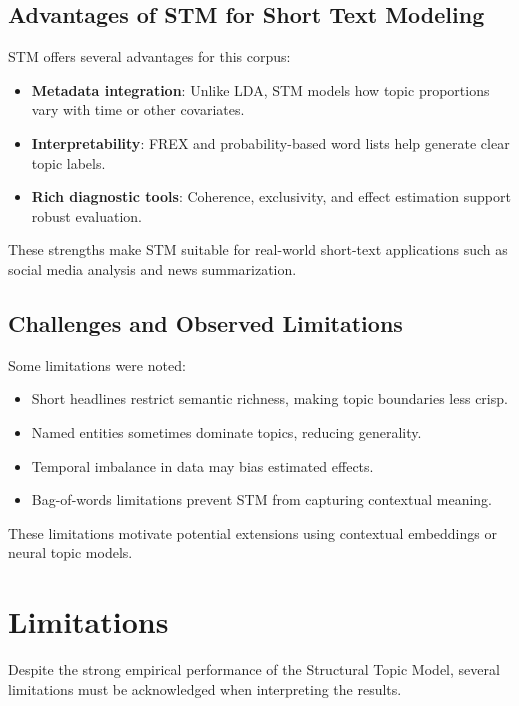 \documentclass[11pt]{article}
\begin{document}
\subsection{Advantages of STM for Short Text Modeling}

STM offers several advantages for this corpus:

\begin{itemize}
    \item \textbf{Metadata integration}: Unlike LDA, STM models how topic proportions vary with time or other covariates.
    \item \textbf{Interpretability}: FREX and probability-based word lists help generate clear topic labels.
    \item \textbf{Rich diagnostic tools}: Coherence, exclusivity, and effect estimation support robust evaluation.
\end{itemize}

These strengths make STM suitable for real-world short-text applications such as social media analysis and news summarization.

\subsection{Challenges and Observed Limitations}

Some limitations were noted:

\begin{itemize}
    \item Short headlines restrict semantic richness, making topic boundaries less crisp.
    \item Named entities sometimes dominate topics, reducing generality.
    \item Temporal imbalance in data may bias estimated effects.
    \item Bag-of-words limitations prevent STM from capturing contextual meaning.
\end{itemize}

These limitations motivate potential extensions using contextual embeddings or neural topic models.

\section{Limitations}

Despite the strong empirical performance of the Structural Topic Model, several limitations must be acknowledged when interpreting the results.
\end{document}

